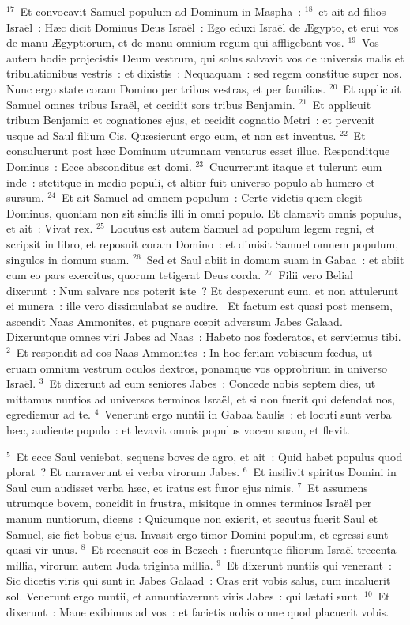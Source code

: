 ${}^{17}$~Et convocavit Samuel populum ad Dominum in Maspha~:
${}^{18}$~et ait ad filios Isra\"el~: H\ae c dicit Dominus Deus Isra\"el~: Ego eduxi Isra\"el de \AE gypto, et erui vos de manu \AE gyptiorum, et de manu omnium regum qui affligebant vos.
${}^{19}$~Vos autem hodie projecistis Deum vestrum, qui solus salvavit vos de universis malis et tribulationibus vestris~: et dixistis~: Nequaquam~: sed regem constitue super nos. Nunc ergo state coram Domino per tribus vestras, et per familias.
${}^{20}$~Et applicuit Samuel omnes tribus Isra\"el, et cecidit sors tribus Benjamin.
${}^{21}$~Et applicuit tribum Benjamin et cognationes ejus, et cecidit cognatio Metri~: et pervenit usque ad Saul filium Cis. Qu\ae sierunt ergo eum, et non est inventus.
${}^{22}$~Et consuluerunt post h\ae c Dominum utrumnam venturus esset illuc. Responditque Dominus~: Ecce absconditus est domi.
${}^{23}$~Cucurrerunt itaque et tulerunt eum inde~: stetitque in medio populi, et altior fuit universo populo ab humero et sursum.
${}^{24}$~Et ait Samuel ad omnem populum~: Certe videtis quem elegit Dominus, quoniam non sit similis illi in omni populo. Et clamavit omnis populus, et ait~: Vivat rex.
${}^{25}$~Locutus est autem Samuel ad populum legem regni, et scripsit in libro, et reposuit coram Domino~: et dimisit Samuel omnem populum, singulos in domum suam.
${}^{26}$~Sed et Saul abiit in domum suam in Gabaa~: et abiit cum eo pars exercitus, quorum tetigerat Deus corda.
${}^{27}$~Filii vero Belial dixerunt~: Num salvare nos poterit iste~? Et despexerunt eum, et non attulerunt ei munera~: ille vero dissimulabat se audire.
~Et factum est quasi post mensem, ascendit Naas Ammonites, et pugnare cœpit adversum Jabes Galaad. Dixeruntque omnes viri Jabes ad Naas~: Habeto nos fœderatos, et serviemus tibi.
${}^{2}$~Et respondit ad eos Naas Ammonites~: In hoc feriam vobiscum fœdus, ut eruam omnium vestrum oculos dextros, ponamque vos opprobrium in universo Isra\"el.
${}^{3}$~Et dixerunt ad eum seniores Jabes~: Concede nobis septem dies, ut mittamus nuntios ad universos terminos Isra\"el, et si non fuerit qui defendat nos, egrediemur ad te.
${}^{4}$~Venerunt ergo nuntii in Gabaa Saulis~: et locuti sunt verba h\ae c, audiente populo~: et levavit omnis populus vocem suam, et flevit.


${}^{5}$~Et ecce Saul veniebat, sequens boves de agro, et ait~: Quid habet populus quod plorat~? Et narraverunt ei verba virorum Jabes.
${}^{6}$~Et insilivit spiritus Domini in Saul cum audisset verba h\ae c, et iratus est furor ejus nimis.
${}^{7}$~Et assumens utrumque bovem, concidit in frustra, misitque in omnes terminos Isra\"el per manum nuntiorum, dicens~: Quicumque non exierit, et secutus fuerit Saul et Samuel, sic fiet bobus ejus. Invasit ergo timor Domini populum, et egressi sunt quasi vir unus.
${}^{8}$~Et recensuit eos in Bezech~: fueruntque filiorum Isra\"el trecenta millia, virorum autem Juda triginta millia.
${}^{9}$~Et dixerunt nuntiis qui venerant~: Sic dicetis viris qui sunt in Jabes Galaad~: Cras erit vobis salus, cum incaluerit sol. Venerunt ergo nuntii, et annuntiaverunt viris Jabes~: qui l\ae tati sunt.
${}^{10}$~Et dixerunt~: Mane exibimus ad vos~: et facietis nobis omne quod placuerit vobis.


